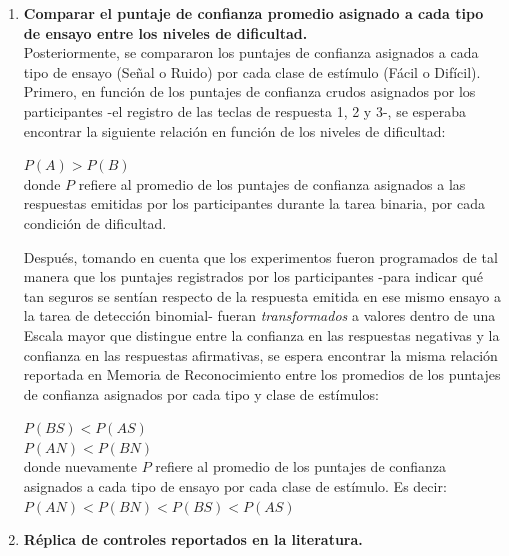\begin{enumerate}
\item \textbf{Comparar el puntaje de confianza promedio asignado a cada tipo de ensayo entre los niveles de dificultad.}\\

Posteriormente, se compararon los puntajes de confianza asignados a cada tipo de ensayo (Señal o Ruido) por cada clase de estímulo (Fácil o Difícil).\\

Primero, en función de los puntajes de confianza crudos asignados por los participantes -el registro de las teclas de respuesta 1, 2 y 3-, se esperaba encontrar la siguiente relación en función de los niveles de dificultad:

\begin{center}
$P(A) > P(B)$\\
donde $P$ refiere al promedio de los puntajes de confianza asignados a las respuestas emitidas por los participantes durante la tarea binaria, por cada condición de dificultad.\\
\end{center}

Después, tomando en cuenta que los experimentos fueron programados de tal manera que los puntajes registrados por los participantes -para indicar qué tan seguros se sentían respecto de la respuesta emitida en ese mismo ensayo a la tarea de detección binomial- fueran \textit{transformados} a valores dentro de una Escala mayor que distingue entre la confianza en las respuestas negativas y la confianza en las respuestas afirmativas, se espera encontrar la misma relación reportada en Memoria de Reconocimiento entre los promedios de los puntajes de confianza asignados por cada tipo y clase de estímulos:\\

\begin{center}
$P(BS) < P(AS)$\\
$P(AN) < P(BN)$\\
donde nuevamente $P$ refiere al promedio de los puntajes de confianza asignados a cada tipo de ensayo por cada clase de estímulo. Es decir:\\
$P(AN) < P(BN) < P(BS) < P(AS)$\\
\end{center}

\item \textbf{Réplica de controles reportados en la literatura.}\\


\end{enumerate}
